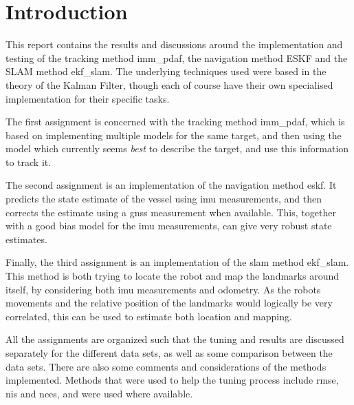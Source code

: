 \section{Introduction}\label{sec:intro}
This report contains the results and discussions around the implementation and testing of the tracking method \acrfull{imm_pdaf}, the navigation method ESKF and the SLAM method \acrfull{ekf_slam}. The underlying techniques used were based in the theory of the Kalman Filter, though each of course have their own specialised implementation for their specific tasks. 

The first assignment is concerned with the tracking method \acrshort{imm_pdaf}, which is based on implementing multiple models for the same target, and then using the model which currently seems \textit{best} to describe the target, and use this information to track it. 

The second assignment is an implementation of the navigation method \acrshort{eskf}. It predicts the state estimate of the vessel using \acrfull{imu} measurements, and then corrects the estimate using a \acrfull{gnss} measurement when available. This, together with a good bias model for the \acrshort{imu} measurements, can give very robust state estimates. 

Finally, the third assignment is an implementation of the \acrshort{slam} method \acrshort{ekf_slam}. This method is both trying to locate the robot and map the landmarks around itself, by considering both \acrshort{imu} measurements and odometry. As the robots movements and the relative position of the landmarks would logically be very correlated, this can be used to estimate both location and mapping. 

All the assignments are organized such that the tuning and results are discussed separately for the different data sets, as well as some comparison between the data sets. There are also some comments and considerations of the methods implemented. Methods that were used to help the tuning process include \acrfull{rmse}, \acrfull{nis} and \acrfull{nees}, and were used where available.







